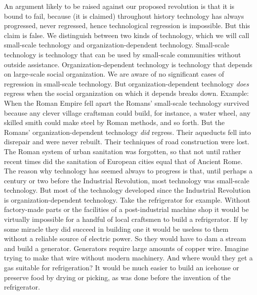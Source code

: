  An argument likely to be raised against our proposed revolution is that it is bound to fail, because (it is claimed) throughout history technology has always progressed, never regressed, hence technological regression is impossible. But this claim is false.\break
{} We distinguish between two kinds of technology, which we will call small-scale technology and organization-dependent technology. Small-scale technology is technology that can be used by small-scale communities without outside assistance. Organization-dependent technology is technology that depends on large-scale social organization. We are aware of no significant cases of regression in small-scale technology. But organization-dependent technology {\em does} regress when the social organization on which it depends breaks down. Example: When the Roman Empire fell apart the Romans’ small-scale technology survived because any clever village craftsman could build, for instance, a water wheel, any skilled smith could make steel by Roman methods, and so forth. But the Romans’ organization-dependent technology {\em did} regress. Their aqueducts fell into disrepair and were never rebuilt. Their techniques of road construction were lost. The Roman system of urban sanitation was forgotten, so that not until rather recent times did the sanitation of European cities equal that of Ancient Rome.
 The reason why technology has seemed always to progress is that, until perhaps a century or two before the Industrial Revolution, most technology was small-scale technology. But most of the technology developed since the Industrial Revolution is organization-dependent technology. Take the refrigerator for example. Without factory-made parts or the facilities of a post-industrial machine shop it would be virtually impossible for a handful of local craftsmen to build a refrigerator. If by some miracle they did succeed in building one it would be useless to them without a reliable source of electric power. So they would have to dam a stream and build a generator. Generators require large amounts of copper wire. Imagine trying to make that wire without modern machinery. And where would they get a gas suitable for refrigeration? It would be much easier to build an icehouse or preserve food by drying or picking, as was done before the invention of the refrigerator.
